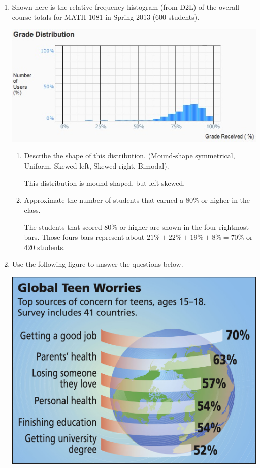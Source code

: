 \documentclass{article}
\newcommand{\answer}[1]{\color{white}#1}
\begin{document}
\begin{enumerate}
\begin{enumerate}
	\end{enumerate}


\item Shown here is the relative frequency histogram (from D2L) of the overall course totals for MATH 1081 in Spring 2013 (600 students). 

\includegraphics[scale=0.5]{WS2_1081Grades.jpg} 

	\begin{enumerate}
	\item Describe the shape of this distribution.  (Mound-shape symmetrical, Uniform, Skewed left, Skewed right, Bimodal).
	
	{\answer{This distribution is mound-shaped, but left-skewed.}} 
	
	\item Approximate the number of students that earned a 80\% or higher in the class.
	
	{\answer{The students that scored 80\% or higher are shown in the four rightmost bars.  Those fours bars represent about $21\%+22\%+19\%+8\%=70\%$ or $420$ students.}} 
	
	\end{enumerate}

\item Use the following figure to answer the questions below.

\includegraphics[scale=0.1]{WS2_Bar.jpg} 


\end{enumerate}
\end{document}
